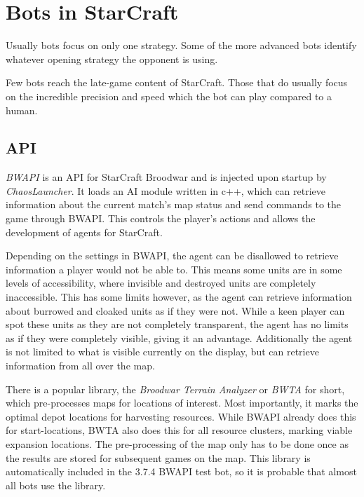 \section{Bots in StarCraft}
Usually bots focus on only one strategy. Some of the more advanced bots identify whatever opening strategy the opponent is using.

Few bots reach the late-game content of StarCraft. Those that do usually focus on the incredible precision and speed which the bot can play compared to a human.


	\subsection*{API}
	\emph{BWAPI} is an API for StarCraft Broodwar and is injected upon startup by \emph{ChaosLauncher}. It loads an AI module written in c++, which can retrieve information about the current match's map status and send commands to the game through BWAPI. This controls the player's actions and allows the development of agents for StarCraft.
	
	Depending on the settings in BWAPI, the agent can be disallowed to retrieve information a player would not be able to. This means some units are in some levels of accessibility, where invisible and destroyed units are completely inaccessible. This has some limits however, as the agent can retrieve information about burrowed and cloaked units as if they were not. While a keen player can spot these units as they are not completely transparent, the agent has no limits as if they were completely visible, giving it an advantage. Additionally the agent is not limited to what is visible currently on the display, but can retrieve information from all over the map.
	
	There is a popular library, the \emph{Broodwar Terrain Analyzer} or \emph{BWTA} for short, which pre-processes maps for locations of interest. Most importantly, it marks the optimal depot locations for harvesting resources. While BWAPI already does this for start-locations, BWTA also does this for all resource clusters, marking viable expansion locations. The pre-processing of the map only has to be done once as the results are stored for subsequent games on the map. This library is automatically included in the 3.7.4 BWAPI test bot, so it is probable that almost all bots use the library.
	
